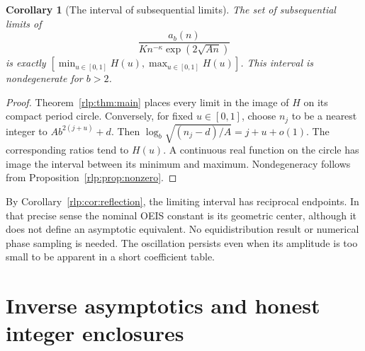 \documentclass[11pt,letterpaper]{article}
\numberwithin{equation}{section}
\newtheorem{corollary}[theorem]{Corollary}
\theoremstyle{remark}\newtheorem{remark}[theorem]{Remark}
\begin{document}
\begin{corollary}[The interval of subsequential limits]\label{rlp:cor:limits}
The set of subsequential limits of
\begin{equation}\label{rlp:eq:ratios}
 \frac{a_b(n)}{K n^{-\kappa}\exp(2\sqrt{An})}
\end{equation}
is exactly $[\min_{u\in[0,1]}H(u),\max_{u\in[0,1]}H(u)]$. This interval is nondegenerate for $b>2$.
\end{corollary}
\begin{proof}
Theorem~\ref{rlp:thm:main} places every limit in the image of $H$ on its compact period circle. Conversely, for fixed $u\in[0,1]$, choose $n_j$ to be a nearest integer to $A b^{2(j+u)}+d$. Then
$\log_b\sqrt{(n_j-d)/A}=j+u+o(1)$. The corresponding ratios tend to $H(u)$. A continuous real function on the circle has image the interval between its minimum and maximum. Nondegeneracy follows from Proposition~\ref{rlp:prop:nonzero}.
\end{proof}
By Corollary~\ref{rlp:cor:reflection}, the limiting interval has reciprocal endpoints. In that precise sense the nominal OEIS constant is its geometric center, although it does not define an asymptotic equivalent. No equidistribution result or numerical phase sampling is needed. The oscillation persists even when its amplitude is too small to be apparent in a short coefficient table.

\section{Inverse asymptotics and honest integer enclosures}
\label{rlp:sec:inverse}
\end{document}
